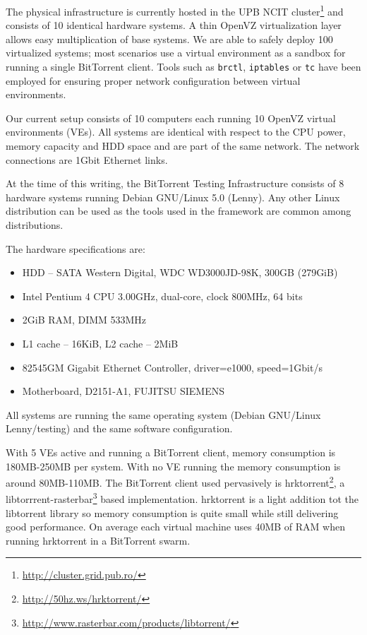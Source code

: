 The physical infrastructure is currently hosted in the UPB NCIT
cluster\footnote{\url{http://cluster.grid.pub.ro/}} and
consists of 10 identical hardware systems. A thin OpenVZ virtualization layer
allows easy multiplication of base systems. We are able to safely deploy 100
virtualized systems; most scenarios use a virtual environment as a sandbox for
running a single BitTorrent client. Tools such as \texttt{brctl},
\texttt{iptables} or \texttt{tc} have been employed for ensuring proper
network configuration between virtual environments.

Our current setup consists of 10 computers each running 10 OpenVZ virtual
environments (VEs). All systems are  identical with respect to the CPU power,
memory capacity and HDD space and are part of the same network. The network
connections are 1Gbit Ethernet links.

At the time of this writing, the BitTorrent Testing Infrastructure consists of
8 hardware systems running Debian GNU/Linux 5.0 (Lenny). Any other Linux
distribution can be used as the tools used in the framework are common among
distributions.

The hardware specifications are:

\begin{itemize}
  \item HDD -- SATA Western Digital, WDC WD3000JD-98K, 300GB (279GiB)
  \item Intel Pentium 4 CPU 3.00GHz, dual-core, clock 800MHz, 64 bits
  \item 2GiB RAM, DIMM 533MHz
  \item L1 cache -- 16KiB, L2 cache -- 2MiB
  \item 82545GM Gigabit Ethernet Controller, driver=e1000, speed=1Gbit/s
  \item Motherboard, D2151-A1, FUJITSU SIEMENS
\end{itemize}

All systems are running the same operating system (Debian GNU/Linux
Lenny/testing) and the same software configuration.

With 5 VEs active and running a BitTorrent client, memory consumption is
180MB-250MB per system. With no VE running the memory consumption is around
80MB-110MB. The BitTorrent client used pervasively is
hrktorrent\footnote{\url{http://50hz.ws/hrktorrent/}}, a
libtorrrent-rasterbar\footnote{\url{http://www.rasterbar.com/products/libtorrent/}} based implementation. hrktorrent is a light addition tot
the libtorrent library so memory consumption is quite small while still
delivering good performance. On average each virtual machine uses 40MB of RAM
when running hrktorrent in a BitTorrent swarm.

